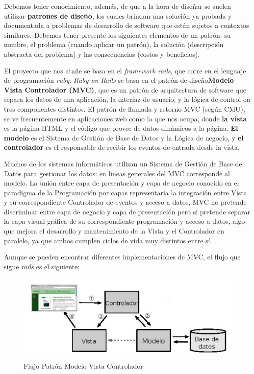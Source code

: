 \documentclass[a4paper,oneside,11pt]{book}
\begin{document}
		Debemos tener conocimiento, además, de que a la hora de diseñar se suelen utilizar \textbf{patrones de diseño}, los cuales brindan una solución ya probada y documentada a problemas de desarrollo de software que están sujetos a contextos similares. Debemos tener presente los siguientes elementos de un patrón: su nombre, el problema (cuando aplicar un patrón), la solución (descripción abstracta del problema) y las consecuencias (costos y beneficios).
		
		El proyecto que nos atañe se basa en el \textit{framework rails}, que corre en el lenguaje de programación \textit{ruby}. \textit{Ruby on Rails} se basa en el patrón de diseño\textbf{Modelo Vista Controlador (MVC)}, que es un patrón de arquitectura de software que separa los datos de una aplicación, la interfaz de usuario, y la lógica de control en tres componentes distintos. El patrón de llamada y retorno MVC (según CMU), se ve frecuentemente en aplicaciones web como la que nos ocupa, donde \textbf{la vista} es la página HTML y el código que provee de datos dinámicos a la página. \textbf{El modelo} es el Sistema de Gestión de Base de Datos y la Lógica de negocio, y \textbf{el controlador} es el responsable de recibir los eventos de entrada desde la vista. 	
		
		Muchos de los sistemas informáticos utilizan un Sistema de Gestión de Base de Datos para gestionar los datos: en líneas generales del MVC corresponde al modelo. La unión entre capa de presentación y capa de negocio conocido en el paradigma de la Programación por capas representaría la integración entre Vista y su correspondiente Controlador de eventos y acceso a datos, MVC no pretende discriminar entre capa de negocio y capa de presentación pero si pretende separar la capa visual gráfica de su correspondiente programación y acceso a datos, algo que mejora el desarrollo y mantenimiento de la Vista y el Controlador en paralelo, ya que ambos cumplen ciclos de vida muy distintos entre sí.
		
		Aunque se pueden encontrar diferentes implementaciones de MVC, el flujo que sigue \textit{rails} es el siguiente:
		
		\begin{figure}[H]
		  \centering
		    \includegraphics[width=16cm]{img/png/mvc.png}
		  \caption{Flujo Patrón Modelo Vista Controlador}
		  \label{fig:patron_mvc}
		\end{figure}
		
\end{document}
